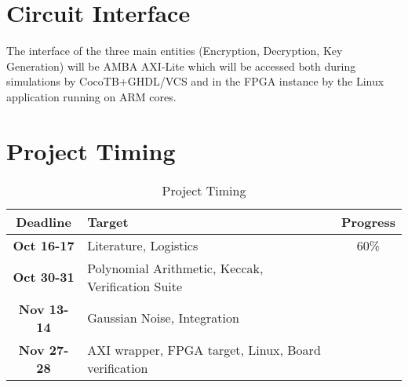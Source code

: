  \chapter{Circuit Interface}
 The interface of the three main entities (Encryption, Decryption, Key Generation) will 
 be AMBA AXI-Lite which will be accessed both during simulations by CocoTB+GHDL/VCS and 
 in the FPGA instance by the Linux application running on ARM cores. 

 \chapter{Project Timing}

 \begin{table}
 \begin{adjustbox}{width=1.2\textwidth,center=\textwidth}
 \begin{tabular}{|c |l |c|}
   \rowcolor{DispositionColor!50}              %
   \textbf{Deadline}  & \textbf{Target} & \textbf{Progress} \\ \hline
   \textbf{Oct 16-17} & Literature, Logistics & 60\% \\
   \textbf{Oct 30-31} & Polynomial Arithmetic, Keccak, Verification Suite &  \\
   \textbf{Nov 13-14} & Gaussian Noise, Integration &  \\
   \textbf{Nov 27-28} & AXI wrapper, FPGA target, Linux, Board verification  &  \\
   \hline
 \end{tabular}
\end{adjustbox}
\caption{Project Timing}
\label{table:schedule}
\end{table}